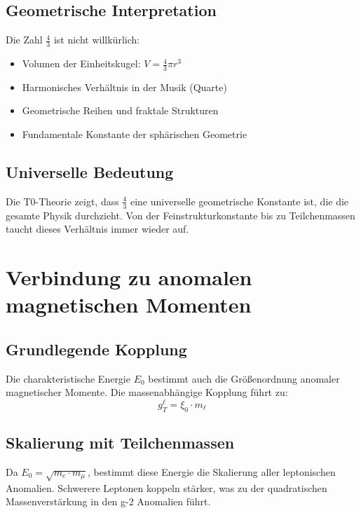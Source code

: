 \documentclass[12pt,a4paper]{article}
\newcommand{\xipar}{\xi_0}
\newcommand{\Ezero}{E_0}
\begin{document}
	\subsection{Geometrische Interpretation}
	
	Die Zahl $\frac{4}{3}$ ist nicht willkürlich:
	\begin{itemize}
		\item Volumen der Einheitskugel: $V = \frac{4}{3}\pi r^3$
		\item Harmonisches Verhältnis in der Musik (Quarte)
		\item Geometrische Reihen und fraktale Strukturen
		\item Fundamentale Konstante der sphärischen Geometrie
	\end{itemize}
	
	\subsection{Universelle Bedeutung}
	
	Die T0-Theorie zeigt, dass $\frac{4}{3}$ eine universelle geometrische Konstante ist, die die gesamte Physik durchzieht. Von der Feinstrukturkonstante bis zu Teilchenmassen taucht dieses Verhältnis immer wieder auf.
	
	\section{Verbindung zu anomalen magnetischen Momenten}
	
	\subsection{Grundlegende Kopplung}
	
	Die charakteristische Energie $\Ezero$ bestimmt auch die Größenordnung anomaler magnetischer Momente. Die massenabhängige Kopplung führt zu:
	\begin{equation}
		g_T^\ell = \xipar \cdot m_\ell
		\label{eq:coupling_g2}
	\end{equation}
	
	\subsection{Skalierung mit Teilchenmassen}
	
	Da $\Ezero = \sqrt{m_e \cdot m_\mu}$, bestimmt diese Energie die Skalierung aller leptonischen Anomalien. Schwerere Leptonen koppeln stärker, was zu der quadratischen Massenverstärkung in den g-2 Anomalien führt.
	
\end{document}
